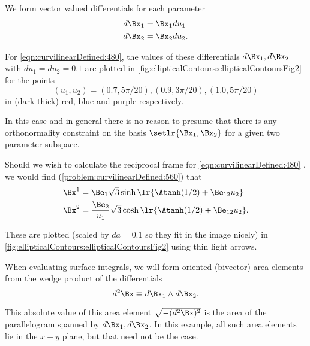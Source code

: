 We form vector valued differentials for each parameter
\begin{dmath}\label{eqn:curvilinearDefined:500}
\begin{aligned}
d\Bx_{1} &= \Bx_1 du_1 \\
d\Bx_{2} &= \Bx_2 du_2.
\end{aligned}
\end{dmath}

For \cref{eqn:curvilinearDefined:480},
the values of these differentials \( d\Bx_1, d\Bx_2 \) with \( du_1 = du_2 = 0.1 \) are plotted
in
\cref{fig:ellipticalContours:ellipticalContoursFig2}
for the points
\begin{dmath}\label{eqn:curvilinearDefined:600}
(u_1, u_2) = (0.7, 5 \pi/20), (0.9, 3 \pi/20), (1.0, 5 \pi/20)
\end{dmath}
in
(dark-thick) red, blue and purple respectively.


In this case and in general there is no reason to presume that there is any orthonormality constraint on the basis \( \setlr{ \Bx_{1}, \Bx_{2} } \) for a given two parameter subspace.

Should we wish to calculate the reciprocal frame
for \cref{eqn:curvilinearDefined:480}
, we would find
(\cref{problem:curvilinearDefined:560}) that
\begin{dmath}\label{eqn:curvilinearDefined:540}
\begin{aligned}
\Bx^{1} &= \Be_1 \sqrt{3} \sinh\lr{ \Atanh(1/2) + \Be_{12} u_2 } \\
\Bx^{2} &= \frac{\Be_2}{u_1} \sqrt{3} \cosh\lr{ \Atanh(1/2) + \Be_{12} u_2 }.
\end{aligned}
\end{dmath}

These are plotted (scaled by \( da = 0.1 \) so they fit in the image nicely) in \cref{fig:ellipticalContours:ellipticalContoursFig2} using thin light arrows.

When evaluating surface integrals, we will form
oriented (bivector) area elements from the wedge product of the differentials
\begin{dmath}\label{eqn:curvilinearDefined:60}
d^2 \Bx \equiv d\Bx_{1} \wedge d\Bx_{2}.
\end{dmath}

This absolute value of this area element \( \sqrt{-(d^2 \Bx)^2} \) is the area of the parallelogram spanned by \( d\Bx_1, d\Bx_2 \).
In this example, all such area elements lie in the \( x-y \) plane, but that need not be the case.

